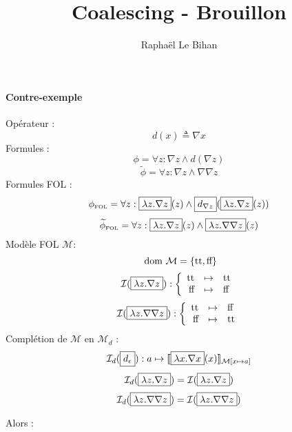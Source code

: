 \documentclass[12pt]{article}
\title{Coalescing - Brouillon}
\author{Raphaël Le Bihan}
\newcommand{\FOL}{\ensuremath{\textup{\tiny{}FOL}}}
\newcommand{\false}{\textup{ff}}
\newcommand{\true}{\textup{tt}}
\newcommand{\M}{\ensuremath{\mathcal{M}}}
\newcommand{\I}{\ensuremath{\mathcal{I}}}
\newcommand{\dom}{\ensuremath{\textup{ dom }}}
\begin{document}
\maketitle

\paragraph{Contre-exemple}

Opérateur : \[ d(x) \triangleq \nabla x \]
Formules :
\[ \phi = \forall z : \nabla z \land d(\nabla z) \]
\[ \widetilde{\phi} = \forall z : \nabla z \land \nabla \nabla z \]
Formules FOL :
\[ \phi_\FOL = \forall z : \framebox{$\lambda z . \nabla z$}(z) \land \framebox{$d_{\nabla z}$}(\framebox{$\lambda z . \nabla z$}(z)) \]
\[ \widetilde{\phi}_\FOL = \forall z :  \framebox{$\lambda z . \nabla z$}(z) \land \framebox{$\lambda z . \nabla \nabla z$}(z) \]
Modèle FOL \M :
\[ \dom \M = \{ \true, \false \} \]
\[ \I(\framebox{$\lambda z . \nabla z$}) :
  \left \{
    \begin{array}{r c l}
      \true & \mapsto & \true \\
      \false & \mapsto & \false
    \end{array}
  \right . \]
\[ \I(\framebox{$\lambda z . \nabla \nabla z$}) :
  \left \{
    \begin{array}{r c l}
      \true & \mapsto & \false \\
      \false & \mapsto & \true
    \end{array}
  \right . \]
Complétion de $\M$ en $\M_d$ :
\[ \I_d(\framebox{$d_\epsilon$}) : a \mapsto
  \llbracket \framebox{$\lambda x . \nabla x$}(x) \rrbracket_{\M[x \mapsto a]} \]
\[ \I_d(\framebox{$\lambda z . \nabla z$}) = \I(\framebox{$\lambda z . \nabla z$}) \]
\[ \I_d(\framebox{$\lambda z . \nabla \nabla z$}) = \I(\framebox{$\lambda z . \nabla \nabla z$}) \]

Alors :
\end{document}
